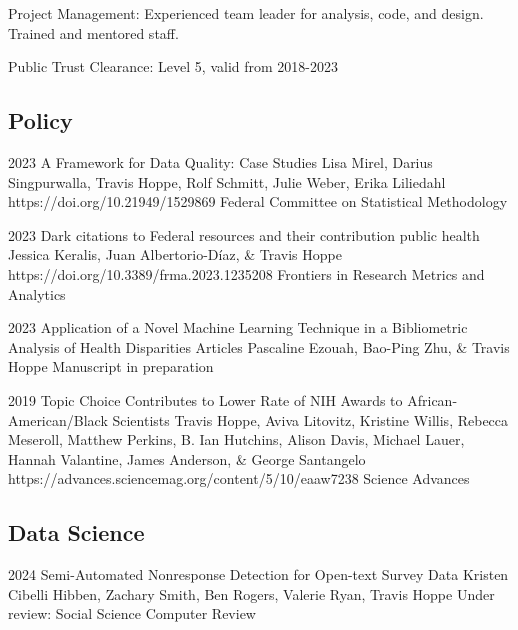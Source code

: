 \documentclass[]{scrartcl}
\begin{document}
\begin{cleanCV}
\WorkExperience
{ }
{Project Management: }
{Experienced team leader for analysis, code, and design. Trained and mentored staff.}

\WorkExperience
{ }
{Public Trust Clearance: }
{Level 5, valid from 2018-2023}



\vspace{-1em}

\subsection{Policy}

\Paper
{2023}
{A Framework for Data Quality: Case Studies}
{Lisa Mirel, Darius Singpurwalla, Travis Hoppe, Rolf Schmitt, Julie Weber, Erika Liliedahl}
{https://doi.org/10.21949/1529869}
{Federal Committee on Statistical Methodology}

\Paper
{2023}
{Dark citations to Federal resources and their contribution public health}
{Jessica Keralis, Juan Albertorio-Díaz, \& Travis Hoppe}
{https://doi.org/10.3389/frma.2023.1235208}
{Frontiers in Research Metrics and Analytics}

\Paper
{2023}
{Application of a Novel Machine Learning Technique in a Bibliometric Analysis of Health Disparities Articles}
{Pascaline Ezouah, Bao-Ping Zhu, \& Travis Hoppe}
{}{Manuscript in preparation}

\Paper
{2019}
{Topic Choice Contributes to Lower Rate of NIH Awards to African-American/Black Scientists}
{Travis Hoppe, Aviva Litovitz, Kristine Willis, Rebecca Meseroll, Matthew Perkins, B. Ian Hutchins, Alison Davis, Michael Lauer, Hannah Valantine, James Anderson, \& George Santangelo}
{https://advances.sciencemag.org/content/5/10/eaaw7238}
{Science Advances}


\subsection{Data Science}


\Paper
{2024}
{Semi-Automated Nonresponse Detection for Open-text Survey Data}
{Kristen Cibelli Hibben, Zachary Smith, Ben Rogers, Valerie Ryan, Travis Hoppe}
{}
{Under review: Social Science Computer Review}



\end{cleanCV}
\end{document}
